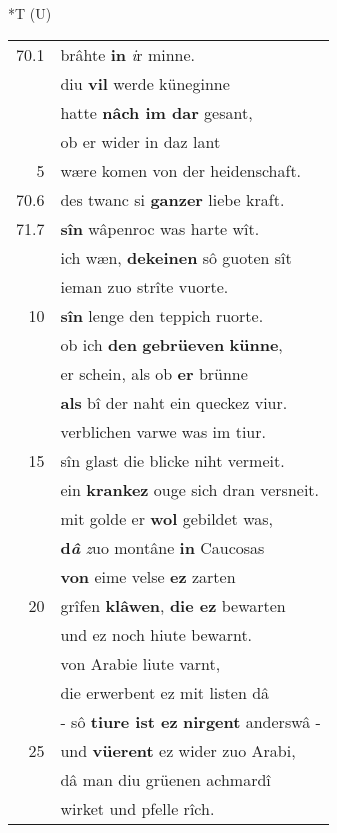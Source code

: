 \documentclass[8pt,a4paper,notitlepage]{article}
\begin{document}
\begin{table}[ht]
\begin{minipage}[t]{0.5\linewidth}
\end{minipage}
\hspace{0.5cm}
\begin{minipage}[t]{0.5\linewidth}
\small
\begin{center}*T (U)
\end{center}
\begin{tabular}{rl}
70.1 & brâhte \textbf{in} \textit{i}r minne.\\ 
 & diu \textbf{vil} werde küneginne\\ 
 & hatte \textbf{nâch im dar} gesant,\\ 
 & ob er wider in daz lant\\ 
5 & wære komen von der heidenschaft.\\ 
70.6 & des twanc si \textbf{ganzer} liebe kraft.\\ 
71.7 & \textbf{sîn} wâpenroc was harte wît.\\ 
 & ich wæn, \textbf{dekeinen} sô guoten sît\\ 
 & ieman zuo strîte vuorte.\\ 
10 & \textbf{sîn} lenge den teppich ruorte.\\ 
 & ob ich \textbf{den} \textbf{gebrüeven} \textbf{künne},\\ 
 & er schein, als ob \textbf{er} brünne\\ 
 & \textbf{als} bî der naht ein queckez viur.\\ 
 & verblichen varwe was im tiur.\\ 
15 & sîn glast die blicke niht vermeit.\\ 
 & ein \textbf{krankez} ouge sich dran versneit.\\ 
 & mit golde er \textbf{wol} gebildet was,\\ 
 & \textbf{d\textit{â}} \textit{z}uo montâne \textbf{in} Caucosas\\ 
 & \textbf{von} eime velse \textbf{ez} zarten\\ 
20 & grîfen \textbf{klâwen}, \textbf{die ez} bewarten\\ 
 & und ez noch hiute bewarnt.\\ 
 & von Arabie liute varnt,\\ 
 & die erwerbent ez mit listen dâ\\ 
 & - sô \textbf{tiure ist ez} \textbf{nirgent} anderswâ -\\ 
25 & und \textbf{vüerent} ez wider zuo Arabi,\\ 
 & dâ man diu grüenen achmardî\\ 
 & wirket und pfelle rîch.\\ 

\end{tabular}
\end{minipage}
\end{table}
\end{document}
